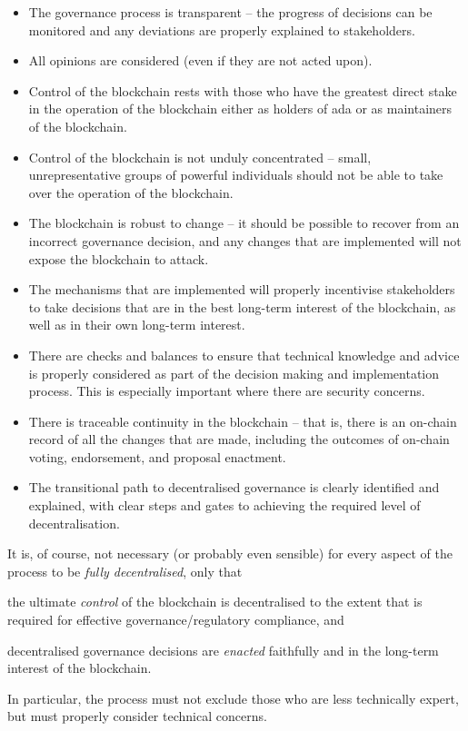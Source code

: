 \begin{itemize}
\item
  The governance process is transparent -- the progress of decisions can be monitored and any deviations are properly explained to stakeholders.
\item
  All opinions are considered (even if they are not acted upon).
\item
  Control of the blockchain rests with those who have the greatest direct stake in the operation of the blockchain either as holders of ada or as maintainers of the blockchain.
\item
  Control of the blockchain is not unduly concentrated -- small, unrepresentative groups of powerful individuals should not be able to take over the operation
  of the blockchain.
\item
  The blockchain is robust to change -- it should be possible to recover from an incorrect governance decision, and any changes that are implemented will not expose the blockchain to attack.
\item
  The mechanisms that are implemented will properly incentivise stakeholders to take decisions that are in the best long-term interest of the blockchain, as well as in their own long-term interest.
\item
  There are checks and balances to ensure that technical knowledge and advice is properly considered as part of the decision making and implementation process.
  This is especially important where there are security concerns.
\item
  There is traceable continuity in the blockchain -- that is, there is an on-chain record of all the changes that are made, including the outcomes of on-chain voting, endorsement, and proposal enactment.
\item
  The transitional path to decentralised governance is clearly identified and explained, with clear steps and gates to achieving the required level of decentralisation.
\end{itemize}


It is, of course, not necessary (or probably even sensible) for every aspect of
the process to be \emph{fully decentralised}, only that
\begin{inparaenum}
\item
  the ultimate \emph{control} of
the blockchain is decentralised to the extent that is required for effective
governance/regulatory compliance, and
\item
  decentralised governance decisions are \emph{enacted} faithfully and in the
  long-term interest of the blockchain.
\end{inparaenum}
In particular, the process must not exclude those who
are less technically expert, but must properly consider technical concerns.


